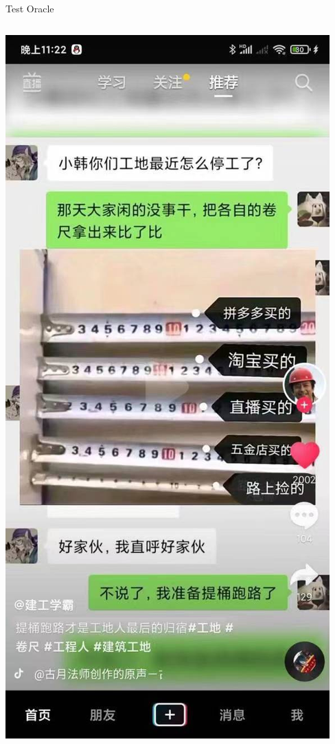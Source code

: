 \documentclass{beamer}
\begin{document}
\begin{frame}[t]{Test Oracle}
    \centering
    \begin{columns}
        \begin{column}{0.3\textwidth}
            
            \includegraphics[width=0.9\linewidth]{images/differential.jpeg} %

\end{column}
\end{columns}
\end{frame}
\end{document}
